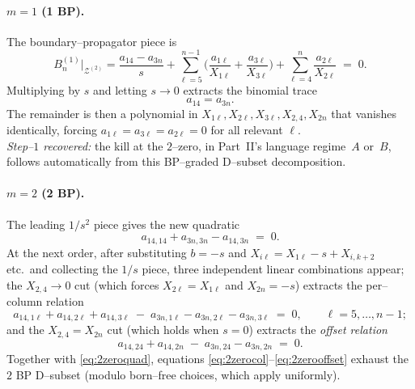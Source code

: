 \documentclass[11pt]{article}
\theoremstyle{definition}
\newcommand{\Z}{\mathcal{Z}}
\newcommand{\X}[1]{X_{#1}}
\begin{document}
\paragraph{$m=1$ (1 BP).}
The boundary--propagator piece is
\begin{equation*}
  B_n^{(1)}\big|_{\Z^{(2)}}
  =\frac{a_{14}-a_{3n}}{s}+\sum_{\ell=5}^{n-1}\Big(\frac{a_{1\ell}}{\X{1\ell}}+\frac{a_{3\ell}}{\X{3\ell}}\Big)+\sum_{\ell=4}^{n}\frac{a_{2\ell}}{\X{2\ell}}\;=\;0.
\end{equation*}
Multiplying by $s$ and letting $s\to0$ extracts the binomial trace
\begin{equation}\label{eq:2zerounit}
  a_{14}=a_{3n}.
\end{equation}
The remainder is then a polynomial in $\X{1\ell},\X{2\ell},\X{3\ell},\X{2,4},\X{2n}$ that vanishes
identically, forcing $a_{1\ell}=a_{3\ell}=a_{2\ell}=0$ for all relevant $\ell$. \\
\emph{Step--$1$ recovered:} the kill at the $2$--zero, in Part~II's language regime~$A$ or~$B$,
follows automatically from this BP--graded D--subset decomposition.

\paragraph{$m=2$ (2 BP).}
The leading $1/s^2$ piece gives the new quadratic
\begin{equation}\label{eq:2zeroquad}
  \boxed{\;a_{14,14}+a_{3n,3n}-a_{14,3n}\;=\;0.\;}
\end{equation}
At the next order, after substituting $b=-s$ and $\X{i\ell}=\X{1\ell}-s+\X{i,k+2}$ etc.\ and
collecting the $1/s$ piece, three independent linear combinations appear; the $\X{2,4}\to0$ cut
(which forces $\X{2\ell}=\X{1\ell}$ and $\X{2n}=-s$) extracts the per--column relation
\begin{equation}\label{eq:2zerocol}
  a_{14,1\ell}+a_{14,2\ell}+a_{14,3\ell}\;-\;a_{3n,1\ell}-a_{3n,2\ell}-a_{3n,3\ell}\;=\;0,
  \qquad \ell=5,\dots,n-1;
\end{equation}
and the $\X{2,4}=\X{2n}$ cut (which holds when $s=0$) extracts the \emph{offset relation}
\begin{equation}\label{eq:2zerooffset}
  a_{14,24}+a_{14,2n}\;-\;a_{3n,24}-a_{3n,2n}\;=\;0.
\end{equation}
Together with \eqref{eq:2zeroquad}, equations \eqref{eq:2zerocol}--\eqref{eq:2zerooffset} exhaust
the $2$ BP D--subset (modulo born--free choices, which apply uniformly).
\end{document}
